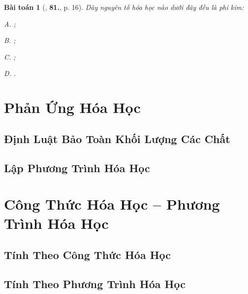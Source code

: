 \documentclass{article}
\numberwithin{equation}{section}
\newtheorem{baitoan}{Bài toán}[section]
\begin{document}
\begin{baitoan}[\cite{An2011}, \textbf{81.}, p. 16]
	Dãy nguyên tố hóa học nào dưới đây đều là phi kim:
	\begin{enumerate*}
		\item[{\rm\sf A.}] ;
		\item[{\rm\sf B.}] ;
		\item[{\rm\sf C.}] ;
		\item[{\rm\sf D.}] .
	\end{enumerate*}
\end{baitoan}



\section{Phản Ứng Hóa Học}

\subsection{Định Luật Bảo Toàn Khối Lượng Các Chất}


\subsection{Lập Phương Trình Hóa Học}


\section{Công Thức Hóa Học -- Phương Trình Hóa Học}

\subsection{Tính Theo Công Thức Hóa Học}


\subsection{Tính Theo Phương Trình Hóa Học}
\end{document}
